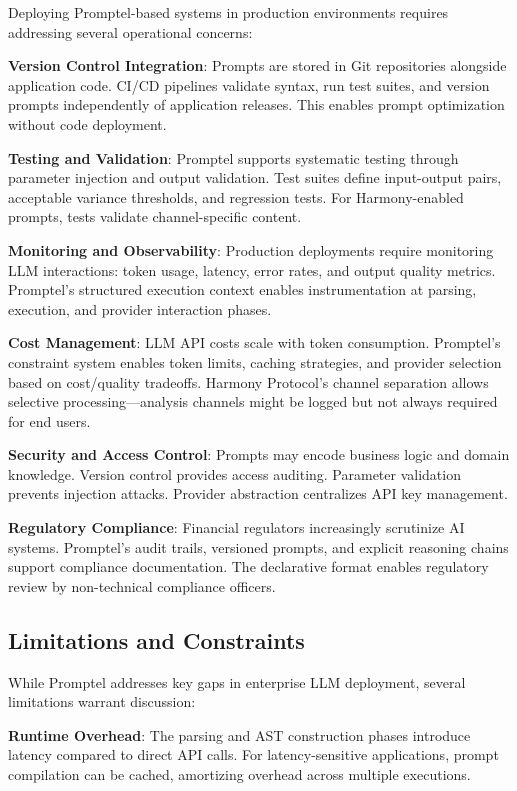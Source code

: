 \documentclass[11pt,a4paper]{article}
\begin{document}
Deploying Promptel-based systems in production environments requires addressing several operational concerns:

\textbf{Version Control Integration}: Prompts are stored in Git repositories alongside application code. CI/CD pipelines validate syntax, run test suites, and version prompts independently of application releases. This enables prompt optimization without code deployment.

\textbf{Testing and Validation}: Promptel supports systematic testing through parameter injection and output validation. Test suites define input-output pairs, acceptable variance thresholds, and regression tests. For Harmony-enabled prompts, tests validate channel-specific content.

\textbf{Monitoring and Observability}: Production deployments require monitoring LLM interactions: token usage, latency, error rates, and output quality metrics. Promptel's structured execution context enables instrumentation at parsing, execution, and provider interaction phases.

\textbf{Cost Management}: LLM API costs scale with token consumption. Promptel's constraint system enables token limits, caching strategies, and provider selection based on cost/quality tradeoffs. Harmony Protocol's channel separation allows selective processing—analysis channels might be logged but not always required for end users.

\textbf{Security and Access Control}: Prompts may encode business logic and domain knowledge. Version control provides access auditing. Parameter validation prevents injection attacks. Provider abstraction centralizes API key management.

\textbf{Regulatory Compliance}: Financial regulators increasingly scrutinize AI systems. Promptel's audit trails, versioned prompts, and explicit reasoning chains support compliance documentation. The declarative format enables regulatory review by non-technical compliance officers.

\subsection{Limitations and Constraints}

While Promptel addresses key gaps in enterprise LLM deployment, several limitations warrant discussion:

\textbf{Runtime Overhead}: The parsing and AST construction phases introduce latency compared to direct API calls. For latency-sensitive applications, prompt compilation can be cached, amortizing overhead across multiple executions.
\end{document}
